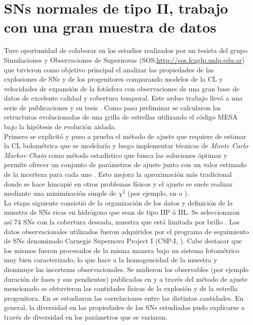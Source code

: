 \documentclass[baaa]{baaa}
\begin{document}
\section{SNs normales de tipo II, trabajo con una gran muestra de datos}\label{csp}

Tuve oportunidad de colaborar en los estudios realizados por un tesista del grupo Simulaciones y Observaciones de Supernovas (SOS,\url{http://sos.fcaglp.unlp.edu.ar}) que tuvieron como objetivo principal el analizar las propiedades de las explosiones de SNs y de los progenitores comparando modelos de la CL y velocidades de expansión de la fotósfera con observaciones de una gran base de datos de excelente calidad y cobertura temporal. 
Este arduo trabajo llevó a una serie de publicaciones y su tesis \citep{tesisLaurean}. Como paso preliminar se calcularon las estructuras evolucionadas de una grilla de estrellas utilizando el código {\sc MESA} \citep{paxton+11,paxton+19} bajo la hipótesis de evolución aislada.\\

Primero se explicitó y puso a prueba el método de ajuste que requiere de estimar la CL bolométrica que se modelaría y luego implementar técnicas de {\em Monte Carlo Markov Chain} como método estadístico que busca las soluciones óptimas y permite ofrecer un conjunto de parámetros de ajuste junto con un valor estimado de la incerteza para cada uno \citep{Martinez2020}. Esto mejora la aproximación más tradicional donde se hace hincapié en otros problemas físicos y el ajuste se suele realizar mediante una minimización simple de $\chi^2$ (por ejemplo, en \citealt{2016Rojas} o \citealt{2018OrellanaBAAA}).\\

La etapa siguiente consistió de la organización de los datos y definición de la muestra de SNs ricas en hidrógeno que sean de tipo IIP ó IIL. Se seleccionaron así 74 SNs con la cobertura deseada, muestra que está limitada por brillo \citep{2022Ma}.
Los datos observacionales utilizados fueron adquiridos por el programa de seguimiento de SNs denominado Carnegie Supernova Project I (CSP-I, \citealt{2006Hamuy}). Cabe destacar que los mismos fueron procesados de la misma manera bajo un sistema fotométrico muy bien caracterizado, lo que hace a la homogeneidad de la muestra y disminuye las incertezas observacionales. 
Se midieron los observables (por ejemplo duración de fases y sus pendientes) publicados en \cite{2022Mb} y a través del método de ajuste mencionado se obtuvieron las cantidades físicas de la explosión y de la estrella progenitora. En \cite{2022Mc} se estudiaron las correlaciones entre las distintas cantidades. En general, la diversidad en las propiedades de las SNs estudiadas pudo explicarse a través de diversidad en los parámetros que se variaron.\\ 
\end{document}
